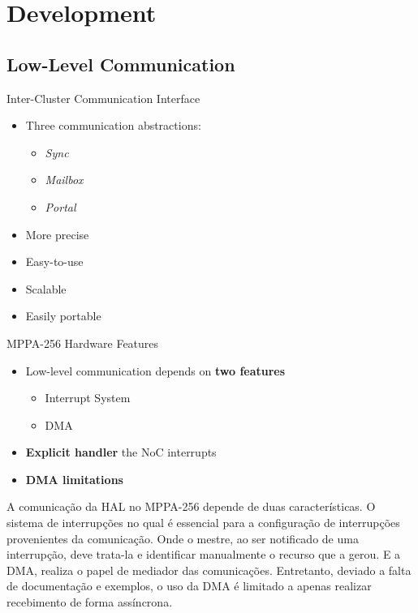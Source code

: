 \section{Development}

	\subsection{Low-Level Communication}

		\begin{frame}[fragile]{Inter-Cluster Communication Interface}

			\begin{itemize}
				\item Three communication abstractions:
				\begin{itemize}
					\item \textit{Sync}
					\item \textit{Mailbox}
					\item \textit{Portal}
				\end{itemize}
				\item More precise
				\item Easy-to-use
				\item Scalable
				\item Easily portable
			\end{itemize}


		\end{frame}

		\begin{frame}[fragile]{MPPA-256 Hardware Features}
			\begin{itemize}
				\item Low-level communication depends on \textbf{two features}
				\begin{itemize}
					\item Interrupt System
					\item DMA
				\end{itemize}
				\item \textbf{Explicit handler} the NoC interrupts %
				\item \textbf{DMA limitations}
			\end{itemize}

			A comunicação da HAL no MPPA-256 depende de duas características.
			O sistema de interrupções no qual é essencial para a configuração de interrupções provenientes da comunicação.
			Onde o mestre, ao ser notificado de uma interrupção, deve trata-la e identificar manualmente o recurso que a gerou.
			E a DMA, realiza o papel de mediador das comunicações. Entretanto, deviado a falta de documentação e exemplos, o uso da DMA é limitado a apenas realizar recebimento de forma assíncrona.
		\end{frame}

